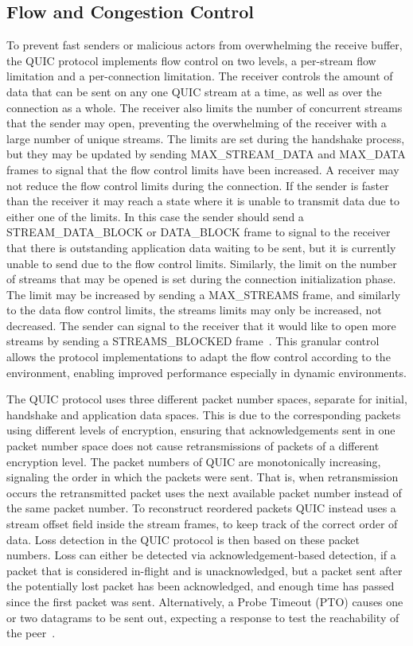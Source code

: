 \documentclass[english, 12pt, a4paper, elec, utf8, a-2b, online]{aaltothesis}
\begin{document}
\subsection{Flow and Congestion Control}

To prevent fast senders or malicious actors from overwhelming the receive buffer,
the QUIC protocol implements flow control on two levels, a per-stream flow limitation
and a per-connection limitation. The receiver controls the amount of data that can
be sent on any one QUIC stream at a time, as well as over the connection as a whole.
The receiver also limits the number of concurrent streams that the sender may open,
preventing the overwhelming of the receiver with a large number of unique streams.
The limits are set during the handshake process, but they may be updated by sending
MAX\_STREAM\_DATA and MAX\_DATA frames to signal that the flow control limits have
been increased. A receiver may not reduce the flow control limits during the connection.
If the sender is faster than the receiver it may reach a state where it is unable
to transmit data due to either one of the limits. In this case the sender should
send a STREAM\_DATA\_BLOCK or DATA\_BLOCK frame to signal to the receiver that
there is outstanding application data waiting to be sent, but it is currently unable to send
due to the flow control limits. Similarly, the limit on the number of streams that
may be opened is set during the connection initialization phase. The limit may be
increased by sending a MAX\_STREAMS frame, and similarly to the data flow control limits,
the streams limits may only be increased, not decreased. The sender can signal to the
receiver that it would like to open more streams by sending a STREAMS\_BLOCKED frame~\cite{rfc9000}.
This granular control allows the protocol implementations to adapt the flow control
according to the environment, enabling improved performance especially in dynamic environments.

The QUIC protocol uses three different packet number spaces, separate for initial,
handshake and application data spaces. This is due to the
corresponding packets using different levels of encryption, ensuring that acknowledgements
sent in one packet number space does not cause retransmissions of packets of a different
encryption level. The packet numbers of QUIC are monotonically increasing, signaling
the order in which the packets were sent. That is, when retransmission occurs the
retransmitted packet uses the next available packet number instead of the same packet number.
To reconstruct reordered packets QUIC instead
uses a stream offset field inside the stream frames, to keep track of the correct
order of data. Loss detection in the QUIC protocol is then based on these packet
numbers. Loss can either be detected via acknowledgement-based detection,
if a packet that is considered in-flight and is unacknowledged, but a packet
sent after the potentially lost packet has been acknowledged, and enough time has passed
since the first packet was sent. Alternatively, a Probe Timeout (PTO) causes one or two
datagrams to be sent out, expecting a response to test the reachability of the peer~\cite{rfc9002}.
\end{document}
